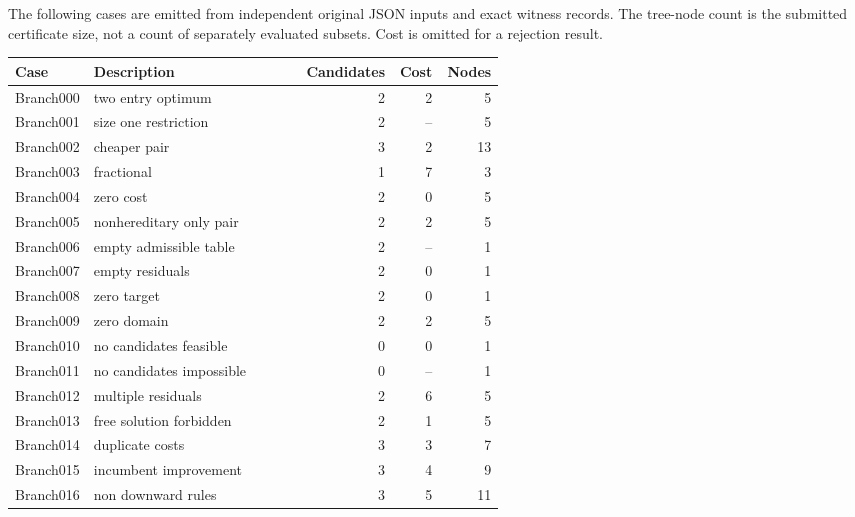 The following cases are emitted from independent original JSON inputs and exact witness records. The tree-node count is the submitted certificate size, not a count of separately evaluated subsets. Cost is omitted for a rejection result.

\begin{longtable}{@{}p{0.14\linewidth}p{0.43\linewidth}rrr@{}}

\toprule Case & Description & Candidates & Cost & Nodes\\\midrule\endhead

Branch000 & two entry optimum & 2 & 2 & 5\\

Branch001 & size one restriction & 2 & -- & 5\\

Branch002 & cheaper pair & 3 & 2 & 13\\

Branch003 & fractional & 1 & 7 & 3\\

Branch004 & zero cost & 2 & 0 & 5\\

Branch005 & nonhereditary only pair & 2 & 2 & 5\\

Branch006 & empty admissible table & 2 & -- & 1\\

Branch007 & empty residuals & 2 & 0 & 1\\

Branch008 & zero target & 2 & 0 & 1\\

Branch009 & zero domain & 2 & 2 & 5\\

Branch010 & no candidates feasible & 0 & 0 & 1\\

Branch011 & no candidates impossible & 0 & -- & 1\\

Branch012 & multiple residuals & 2 & 6 & 5\\

Branch013 & free solution forbidden & 2 & 1 & 5\\

Branch014 & duplicate costs & 3 & 3 & 7\\

Branch015 & incumbent improvement & 3 & 4 & 9\\

Branch016 & non downward rules & 3 & 5 & 11\\


\end{longtable}
